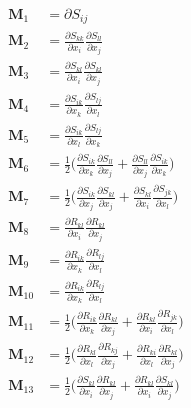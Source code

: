%
\begin{subequations}
\begin{align}
	\label{E:36}
	\mathbf{M}_1  &= \partial S_{ij}  \\
	\mathbf{M}_2  &= \frac{\partial S_{kk}}{\partial x_i}
					 \frac{\partial S_{ll}}{\partial x_j} \\
	\mathbf{M}_3  &= \frac{\partial S_{kl}}{\partial x_i}
					 \frac{\partial S_{kl}}{\partial x_j} \\
	\mathbf{M}_4  &= \frac{\partial S_{ik}}{\partial x_k}
					 \frac{\partial S_{lj}}{\partial x_l} \\	
	\mathbf{M}_5  &= \frac{\partial S_{ik}}{\partial x_l}
					 \frac{\partial S_{lj}}{\partial x_k} \\	
	\mathbf{M}_6  &= \frac{1}{2} 
			  \bigg( \frac{\partial S_{ik}}{\partial x_k}
					 \frac{\partial S_{ll}}{\partial x_j} 
				  	+ 
					 \frac{\partial S_{ll}}{\partial x_j} 
					 \frac{\partial S_{ik}}{\partial x_k} \bigg) \\	
	\mathbf{M}_7  &= \frac{1}{2} 
			  \bigg( \frac{\partial S_{ik}}{\partial x_j}
					 \frac{\partial S_{kl}}{\partial x_j} 
				    + 
					 \frac{\partial S_{kl}}{\partial x_i} 
					 \frac{\partial S_{jk}}{\partial x_l} \bigg) \\				 
	\mathbf{M}_8  &= \frac{\partial R_{kl}}{\partial x_i}
					 \frac{\partial R_{kl}}{\partial x_j} \\
	\mathbf{M}_9  &= \frac{\partial R_{ik}}{\partial x_k}
					 \frac{\partial R_{lj}}{\partial x_l} \\
	\mathbf{M}_{10} &= \frac{\partial R_{ik}}{\partial x_k}
					 \frac{\partial R_{lj}}{\partial x_l} \\
	\mathbf{M}_{11}  &= \frac{1}{2} 
			  \bigg( \frac{\partial R_{ik}}{\partial x_k}
					 \frac{\partial R_{kl}}{\partial x_j} 
				  	+ 
					 \frac{\partial R_{kl}}{\partial x_i} 
					 \frac{\partial R_{jk}}{\partial x_l} \bigg) \\
	\mathbf{M}_{12}  &= \frac{1}{2} 
			  \bigg( \frac{\partial R_{kl}}{\partial x_l}
					 \frac{\partial R_{kj}}{\partial x_j} 
				  	+ 
					 \frac{\partial R_{ki}}{\partial x_l} 
					 \frac{\partial R_{kl}}{\partial x_j} \bigg)  \\	
	\mathbf{M}_{13}  &= \frac{1}{2} 
			  \bigg( \frac{\partial S_{kl}}{\partial x_i}
					 \frac{\partial R_{kl}}{\partial x_j} 
				  	+ 
					 \frac{\partial R_{kl}}{\partial x_i}
					 \frac{\partial S_{kl}}{\partial x_j}  \bigg)  \\

\end{align}
\end{subequations}
